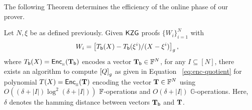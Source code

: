 \begin{comment}
        \item In addition, the other things (apart from $[Q(X)]_2$) needed for the current round of the lookup protocol are also computed by the prover as described in the lookup protocol in section 5.1 as it is just naive computation

    \end{enumerate}
    \subsection{Computation of $[Q(X)]_2$}
    Clearly, it suffices to efficiently compute $[Q(X)]_2$ where $[Q(X)]_2=\gtwo{\frac{T(X)-T_I(X)}{Z_I(X)}}$. We have the information of $[\Tbasepoly{X}-\Tbasepoly{\xi^i}/(X-\xi^i)]_2$. For this, we have the following lemma:
\end{comment}
The following Theorem determines the efficiency of the online phase of our prover.
\begin{theorem}\label{thm:approx-setup}
Let $N,\xi$ be as defined previously. Given
$\mathsf{KZG}$ proofs $\{W_i\}_{i=1}^N$ with 
\[W_i=\left[{T_{\mathsf{b}}({X}) - T_{\mathsf{b}}({\xi^i})/(X-\xi^i)}\right]_g,\] where
$T_{\mathsf{b}}({X})=\mathsf{Enc}_{{}_{\mathbb{H}}}(\mathbf{T_{\mathsf{b}}})$ encodes a vector $\mathbf{T}_{\mathsf{b}}\in \mathbb{F}^N$, for any $I\subseteq [N]$, there exists an algorithm to compute $\left[{Q}\right]_g$ as given in Equation ~\eqref{eq:enc-quotient}
for polynomial $T(X)=\mathsf{Enc}_{{}_{\mathbb{H}}}(\mathbf{T})$ encoding the vector $\mathbf{T}\in \mathbb{F}^N$ using $O((\delta + |I|) \log^2 (\delta + |I|))$ $\mathbb{F}$-operations
and $O(\delta + |I|)$ $\mathbb{G}$-operations. Here, $\delta$ denotes the hamming distance
between vectors $\mathbf{T}_{\mathsf{b}}$ and $\mathbf{T}$.
\end{theorem}
